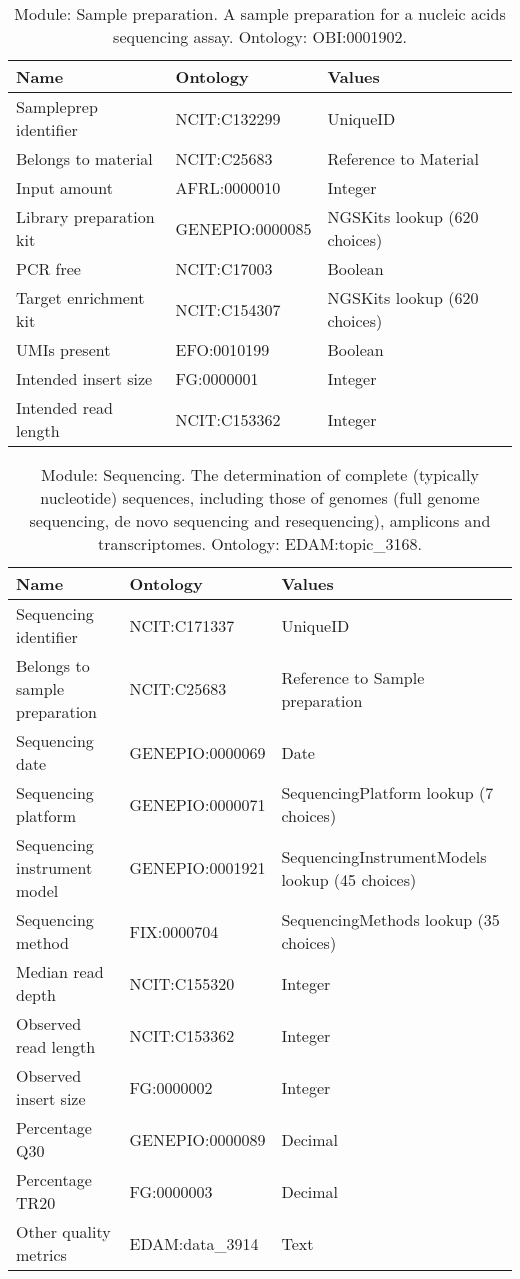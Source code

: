 \documentclass{article}
\begin{document}
\begin{table}[htb]
\begin{tabular}{lll}
Name & Ontology & Values \\
\hline
Sampleprep identifier & NCIT:C132299 & UniqueID \\
Belongs to material & NCIT:C25683 & Reference to Material \\
Input amount & AFRL:0000010 & Integer \\
Library preparation kit & GENEPIO:0000085 & NGSKits lookup (620 choices) \\
PCR free & NCIT:C17003 & Boolean \\
Target enrichment kit & NCIT:C154307 & NGSKits lookup (620 choices) \\
UMIs present & EFO:0010199 & Boolean \\
Intended insert size & FG:0000001 & Integer \\
Intended read length & NCIT:C153362 & Integer \\
\hline
\end{tabular}
\caption[Module: Sample preparation]{\label{table:table8} Module: Sample preparation. A sample preparation for a nucleic acids sequencing assay. Ontology: OBI:0001902. }
\end{table}

\begin{table}[htb]
\begin{tabular}{lll}
Name & Ontology & Values \\
\hline
Sequencing identifier & NCIT:C171337 & UniqueID \\
Belongs to sample preparation & NCIT:C25683 & Reference to Sample preparation \\
Sequencing date & GENEPIO:0000069 & Date \\
Sequencing platform & GENEPIO:0000071 & SequencingPlatform lookup (7 choices) \\
Sequencing instrument model & GENEPIO:0001921 & SequencingInstrumentModels lookup (45 choices) \\
Sequencing method & FIX:0000704 & SequencingMethods lookup (35 choices) \\
Median read depth & NCIT:C155320 & Integer \\
Observed read length & NCIT:C153362 & Integer \\
Observed insert size & FG:0000002 & Integer \\
Percentage Q30 & GENEPIO:0000089 & Decimal \\
Percentage TR20 & FG:0000003 & Decimal \\
Other quality metrics & EDAM:data\_3914 & Text \\
\hline
\end{tabular}
\caption[Module: Sequencing]{\label{table:table9} Module: Sequencing. The determination of complete (typically nucleotide) sequences, including those of genomes (full genome sequencing, de novo sequencing and resequencing), amplicons and transcriptomes. Ontology: EDAM:topic\_3168. }
\end{table}
\end{document}
